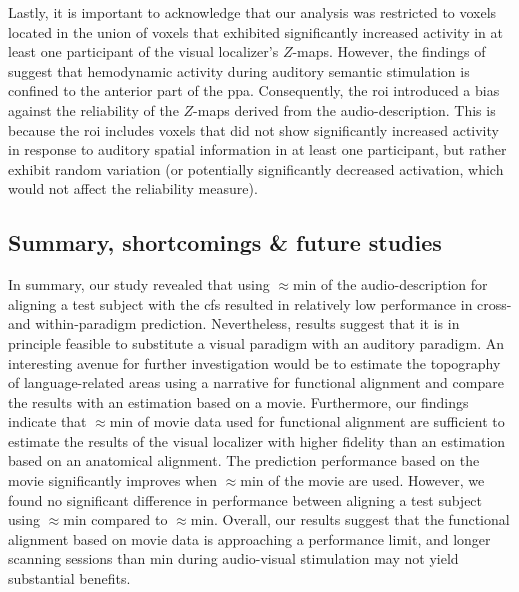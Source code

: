 %
Lastly, it is important to acknowledge that our analysis was restricted to
voxels located in the union of voxels that exhibited significantly increased
activity in at least one participant of the visual localizer's $Z$-maps.
%
However, the findings of \citet{haeusler2022processing} suggest that hemodynamic
activity during auditory semantic stimulation is confined to the anterior part
of the \ac{ppa}.
%
Consequently, the \ac{roi} introduced a bias against the reliability of the
$Z$-maps derived from the audio-description.
%
This is because the \ac{roi} includes voxels that did not show significantly
increased activity in response to auditory spatial information in at least one
participant, but rather exhibit random variation (or potentially significantly
decreased activation, which would not affect the reliability measure).


\subsection{Summary, shortcomings \& future studies}

%
In summary, our study revealed that using $\approx$\unit[15]{min} of the
audio-description for aligning a test subject with the \ac{cfs} resulted in
relatively low performance in cross- and within-paradigm prediction.
%
Nevertheless, results suggest that it is in principle feasible to substitute a
visual paradigm with an auditory paradigm.
%
An interesting avenue for further investigation would be to estimate the
topography of language-related areas using a narrative for functional alignment
and compare the results with an estimation based on a movie.
%
Furthermore, our findings indicate that $\approx$\unit[15]{min} of movie data
used for functional alignment are sufficient to estimate the results of the
visual localizer with higher fidelity than an estimation based on an anatomical
alignment.
%
The prediction performance based on the movie significantly improves when
$\approx$\unit[30]{min} of the movie are used.
%
However, we found no significant difference in performance between aligning a
test subject using $\approx$\unit[45]{min} compared to $\approx$\unit[30]{min}.
%
Overall, our results suggest that the functional alignment based on movie data
is approaching a performance limit, and longer scanning sessions than
\unit[30]{min} during audio-visual stimulation may not yield substantial
benefits.

